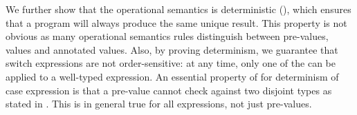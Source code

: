 \begin{comment}
\begin{lemma}[Substitution]
  \label{lemma:union:substitution}
  If \ $[[G, x:B , G1 |- e dirflag A]]$ \ and \ $[[G |- e' => B]]$
  then \ $[[G, G1 |- e [ x ~> e' ] dirflag A]]$
\end{lemma}

\begin{proof}
By induction on typing relation.
  \begin{itemize}
    \item Cases \rref{typ-int, typ-var, typ-app, typ-sub, typ-abs} are trivial to prove.
    \item Case \rref{typ-anno} requires \cref{lemma:union:value-not-value}.
    \item Case \rref{typ-typeof} requires
    \cref{lemma:union:check-pexpr-ann,lemma:union:check-or-typ,lemma:union:pexpr-inf-typ}.
  \end{itemize}
\end{proof}

\begin{lemma}[Value Decidability]
\label{lemma:union:value-not-value}
$\forall$ $[[e]]$, \ value \ $[[e]]$ \ $\vee$ \ $\neg$ value \ $[[e]]$.
\end{lemma}

\begin{lemma}[check-or-typ]
\label{lemma:union:check-or-typ}
If \ $[[A *s B]]$ \ and \ $[[G |- p <= A \/ B]]$ \ then:
  \begin{enumerate}
    \item either \ $[[G |- p <= A]]$
    \item or \ $[[G |- p <= B]]$
  \end{enumerate}
\end{lemma}

\begin{lemma}[pexpr-inf-typ]
\label{lemma:union:pexpr-inf-typ}
If \ $[[G |- p <= A]]$ \ then:
  \begin{enumerate}
  \item $\exists$ $[[B]]$, \ $[[B <: A]]$
  \item and \ $[[G |- p => B]]$
  \end{enumerate}
\end{lemma}
\end{comment}

We further show that the operational semantics is deterministic 
(), which ensures
that a program will always produce the same unique result. This property is not
obvious as many operational semantics rules distinguish between pre-values,
values and annotated values. Also, by proving determinism, we guarantee that
switch expressions are not order-sensitive: at any time, only one of the
 can be applied to a well-typed expression.
An essential property of \cal for determinism of case expression is 
that a pre-value cannot check against two disjoint types as stated in
. This is in general true for
all expressions, not just pre-values.


